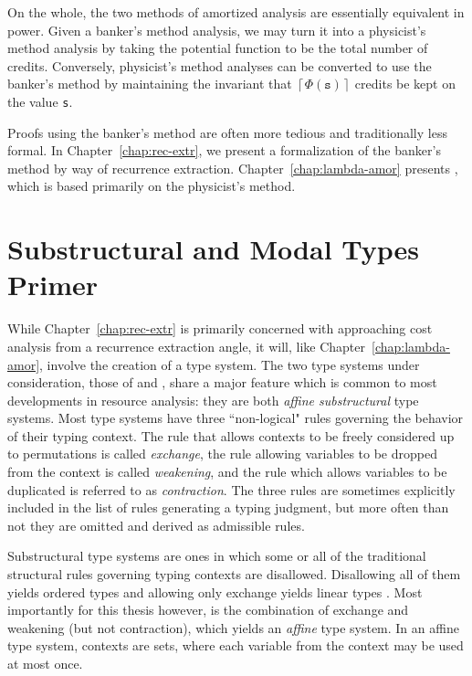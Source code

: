 On the whole, the two methods of amortized analysis are essentially equivalent in power. Given a banker's method analysis, we may turn it into a physicist's method analysis by taking the potential function to be the total number of credits. Conversely, physicist's method analyses can be converted to use the banker's method by maintaining the invariant that $ \left\lceil{\Phi(\texttt{s})}\right \rceil$ credits be kept on the value \texttt{s}.

Proofs using the banker's method are often more tedious and traditionally less formal. In Chapter~\ref{chap:rec-extr}, we present a formalization of the banker's method by way of recurrence extraction. Chapter~\ref{chap:lambda-amor} presents \lambdaamor, which is based primarily on the physicist's method.

\section{Substructural and Modal Types Primer}
\label{sec:modal-and-substructural}
While Chapter~\ref{chap:rec-extr} is primarily concerned with approaching cost analysis from a recurrence extraction angle, it will, like Chapter~\ref{chap:lambda-amor}, involve the creation of a type system. The two type systems under consideration, those of \lambdaA and \lambdaamor, share a major feature which is common to most developments in resource analysis: they are both \textit{affine substructural} type systems. Most type systems have three ``non-logical" rules governing the behavior of their typing context. The rule that allows contexts to be freely considered up to permutations is called \textit{exchange}, the rule allowing variables to be dropped from the context is called \textit{weakening}, and the rule which allows variables to be duplicated is referred to as \textit{contraction}. The three rules are sometimes explicitly included in the list of rules generating a typing judgment, but more often than not they are omitted and derived as admissible rules.

Substructural type systems are ones in which some or all of the traditional structural rules governing typing contexts are disallowed. Disallowing all of them yields ordered types \citehere and allowing only exchange yields linear types \citehere. Most importantly for this thesis however, is the combination of exchange and weakening (but not contraction), which yields an \textit{affine} type system. In an affine type system, contexts are sets, where each variable from the context may be used at most once.

